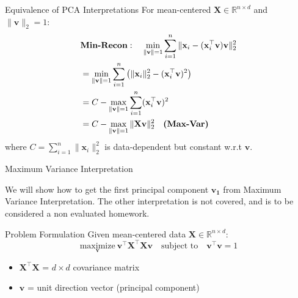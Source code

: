 \documentclass{beamer}
\begin{document}
\begin{frame}{Equivalence of PCA Interpretations}
        For mean-centered $\mathbf{X} \in \mathbb{R}^{n \times d}$ and $\|\mathbf{v}\|_2 = 1$:
        \begin{align*}
            &\text{\textbf{Min-Recon}}: \quad \min_{\|\mathbf{v}\|=1} \sum_{i=1}^n \|\mathbf{x}_i - (\mathbf{x}_i^\top \mathbf{v})\mathbf{v}\|_2^2 \\
            &= \min_{\|\mathbf{v}\|=1} \sum_{i=1}^n \left( \|\mathbf{x}_i\|_2^2 - (\mathbf{x}_i^\top \mathbf{v})^2 \right) \\
            &= C - \max_{\|\mathbf{v}\|=1} \sum_{i=1}^n (\mathbf{x}_i^\top \mathbf{v})^2 \\
            &= C - \max_{\|\mathbf{v}\|=1} \|\mathbf{X}\mathbf{v}\|_2^2 \quad \text{\textbf{(Max-Var)}} 
        \end{align*}
        where $C = \sum_{i=1}^n \|\mathbf{x}_i\|_2^2$ is data-dependent but constant w.r.t $\mathbf{v}$.

\end{frame}


\begin{frame}{Maximum Variance Interpretation}

We will show how to get the first principal component $\mathbf{v_1}$ from Maximum Variance Interpretation. The other interpretation is not covered, and is to be considered a non evaluated homework.

\vspace{0.3cm}

    \begin{block}{Problem Formulation}
        Given mean-centered data $\mathbf{X} \in \mathbb{R}^{n \times d}$:
        \vspace{-0.2cm}
        \[
        \underset{\mathbf{v}}{\text{maximize}}\ \mathbf{v}^\top \mathbf{X}^\top \mathbf{X} \mathbf{v} \quad \text{subject to}\quad \mathbf{v}^\top \mathbf{v} = 1
        \]
        \begin{itemize}
            \item $\mathbf{X}^\top \mathbf{X}$ = $d \times d$ covariance matrix
            \item $\mathbf{v}$ = unit direction vector (principal component)
        \end{itemize}
    \end{block}
\end{frame}
\end{document}
